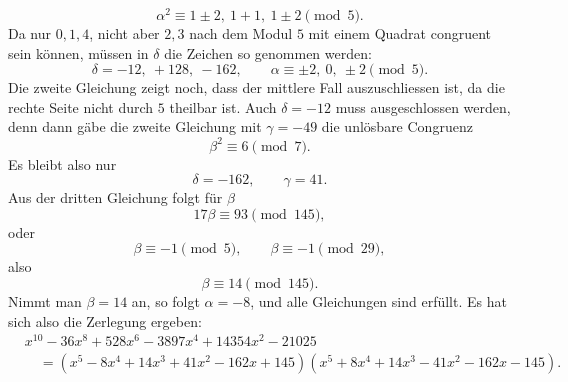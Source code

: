 \documentclass[11pt]{article}
\begin{document}
\[
        \alpha^2\equiv1\pm2,\ 1+1,\ 1\pm2\pmod5.
\]
Da nur $0,1,4$, nicht aber $2,3$ nach dem Modul $5$ mit einem Quadrat congruent sein können, müssen in $\delta$ die Zeichen so genommen werden:
\[
        \delta=-12,\ +128,\ -162,
        \qquad
        \alpha\equiv\pm2,\ 0,\ \pm2\pmod5.
\]
Die zweite Gleichung zeigt noch, dass der mittlere Fall auszuschliessen ist, da die rechte Seite nicht durch $5$ theilbar ist. Auch $\delta=-12$ muss ausgeschlossen werden, denn dann gäbe die zweite Gleichung mit $\gamma=-49$ die unlösbare Congruenz
\[
        \beta^2\equiv6\pmod7.
\]
Es bleibt also nur
\[
        \delta=-162,\qquad \gamma=41.
\]
Aus der dritten Gleichung folgt für $\beta$
\[
        17\beta\equiv93\pmod{145},
\]
oder
\[
        \beta\equiv -1\pmod5,\qquad \beta\equiv -1\pmod{29},
\]
also
\[
        \beta\equiv14\pmod{145}.
\]
Nimmt man $\beta=14$ an, so folgt $\alpha=-8$, und alle Gleichungen sind erfüllt. Es hat sich also die Zerlegung ergeben:
\[
\begin{aligned}
&x^{10}-36x^8+528x^6-3897x^4+14354x^2-21025\\
&\quad=(x^5-8x^4+14x^3+41x^2-162x+145)
       (x^5+8x^4+14x^3-41x^2-162x-145).
\end{aligned}
\]
\end{document}
